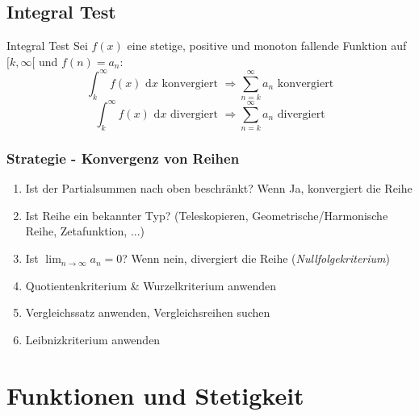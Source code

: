 \documentclass[a4paper,8pt]{extarticle}
\def\limn{\lim_{n\to \infty}}
\def\dx{\text{ d}x}
\begin{document}
\subsection{Integral Test}
\begin{mainbox}{Integral Test}
  Sei $f(x)$ eine stetige, positive und monoton fallende Funktion auf $[k, \infty[$ und $f(n) = a_n$:
  $$\int_k^\infty f(x)\dx \text{ konvergiert } \Rightarrow \sum_{n = k}^\infty a_n \text{ konvergiert}$$$$\int_k^\infty f(x)\dx \text{ divergiert } \Rightarrow \sum_{n = k}^\infty a_n \text{ divergiert}$$
\end{mainbox}

\subsubsection{Strategie - Konvergenz von Reihen}
\begin{enumerate}
  \item Ist der Partialsummen nach oben beschränkt? Wenn Ja, konvergiert die Reihe
 \item Ist Reihe ein bekannter Typ? (Teleskopieren, Geometrische/Harmonische Reihe, Zetafunktion, ...)
 \item Ist $\limn a_n = 0$? Wenn nein, divergiert die Reihe (\textit{Nullfolgekriterium})
 \item Quotientenkriterium \& Wurzelkriterium anwenden
 \item Vergleichssatz anwenden, Vergleichsreihen suchen
 \item Leibnizkriterium anwenden
\end{enumerate}

\section{Funktionen und Stetigkeit}
\end{document}

